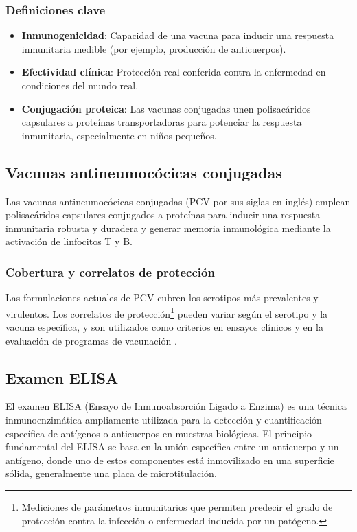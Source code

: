 \subsubsection{Definiciones clave}
\begin{itemize}
    \item \textbf{Inmunogenicidad}: Capacidad de una vacuna para inducir una respuesta inmunitaria medible (por ejemplo, producción de anticuerpos).
    \item \textbf{Efectividad clínica}: Protección real conferida contra la enfermedad en condiciones del mundo real.
    \item \textbf{Conjugación proteica}: Las vacunas conjugadas unen polisacáridos capsulares a proteínas transportadoras para potenciar la respuesta inmunitaria, especialmente en niños pequeños.
\end{itemize}

\subsection{Vacunas antineumocócicas conjugadas}


Las vacunas antineumocócicas conjugadas (PCV por sus siglas en inglés) emplean polisacáridos capsulares conjugados a proteínas para inducir una respuesta inmunitaria robusta y duradera y generar memoria inmunológica mediante la activación de linfocitos T y B.


\subsubsection{Cobertura y correlatos de protección}
Las formulaciones actuales de PCV cubren los serotipos más prevalentes y virulentos. Los correlatos de protección\footnote{Mediciones de parámetros inmunitarios que permiten predecir el grado de protección contra la infección o enfermedad inducida por un patógeno.} pueden variar según el serotipo y la vacuna específica, y son utilizados como criterios en ensayos clínicos y en la evaluación de programas de vacunación \cite{Snedecor2020a}.

\subsection{Examen ELISA}

El examen ELISA (Ensayo de Inmunoabsorción Ligado a Enzima) es una técnica inmunoenzimática ampliamente utilizada para la detección y cuantificación específica de antígenos o anticuerpos en muestras biológicas. El principio fundamental del ELISA se basa en la unión específica entre un anticuerpo y un antígeno, donde uno de estos componentes está inmovilizado en una superficie sólida, generalmente una placa de microtitulación.

